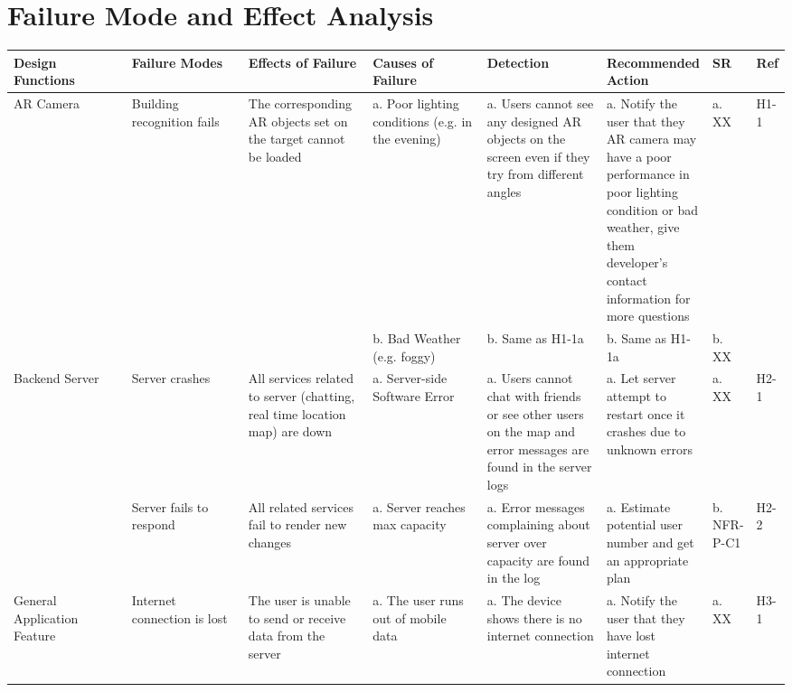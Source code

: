 \documentclass{article}
\begin{document}
\section{Failure Mode and Effect Analysis}
\begin{table}[H]
    \begin{adjustbox}{width=(/5)}
    \centering
    

    \begin{tabular}{|p{0.20\linewidth} | p{0.20\linewidth} | p{0.20\linewidth}|  p{0.20\linewidth}|  p{0.21\linewidth}|  p{0.30\linewidth}|  p{0.08\linewidth}|p{0.07\linewidth}| }
    \hline
         \textbf{Design Functions} & \textbf{Failure Modes} & \textbf{Effects of Failure} & \textbf{Causes of Failure} &\textbf{Detection}& \textbf{Recommended Action} & \textbf{SR} & \textbf{Ref}\\
         \hline
         AR Camera      &     Building recognition fails      &      The corresponding AR objects set on the target cannot be loaded      &      a. Poor lighting conditions (e.g. in the evening)      &      a. Users cannot see any designed AR objects on the screen even if they try from different angles      &      a. Notify the user that they AR camera may have a poor performance in poor lighting condition or bad weather, give them developer's contact information for more questions      &      a. XX      &      H1-1      \\
         &&&      b. Bad Weather (e.g. foggy)      &      b. Same as H1-1a      &      b. Same as H1-1a      &      b. XX      &      \\
         \hline
         Backend Server     &    Server crashes      &      All services related to server (chatting, real time location map) are down      &      a. Server-side Software Error      &      a. Users cannot chat with friends or see other users on the map and error messages are found in the server logs      &      a. Let server attempt to restart once it crashes due to unknown errors      &      a. XX      &      H2-1      \\
         &      Server fails to respond      &       All related services fail to render new changes      &      a. Server reaches max capacity      &      a. Error messages complaining about server over capacity are found in the log      &      a. Estimate potential user number and get an appropriate plan      &      b. NFR-P-C1      &      H2-2      \\
         \hline
        General Application Feature      &      Internet connection is lost      &       The user is unable to send or receive data from the server     &      a. The user runs out of mobile data      &      a. The device shows there is no internet connection       &      a. Notify the user that they have lost internet connection      &      a. XX      &      H3-1      \\

\end{tabular}
\end{adjustbox}
\end{table}
\end{document}
